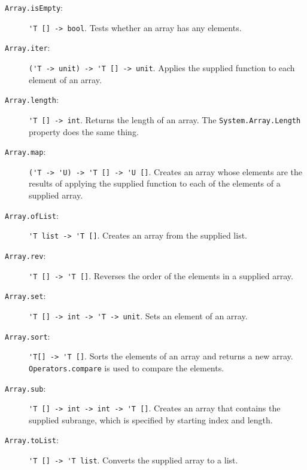 \begin{description}
\item[\texttt{Array.isEmpty}:] \lstinline{'T [] -> bool}. Tests whether an array has any elements.
\item[\texttt{Array.iter}:] \lstinline{('T -> unit) -> 'T [] -> unit}. Applies the supplied function to each element of an array.
\item[\texttt{Array.length}:] \lstinline{'T [] -> int}. Returns the length of an array. The \lstinline{System.Array.Length} property does the same thing.
\item[\texttt{Array.map}:] \lstinline{('T -> 'U) -> 'T [] -> 'U []}. Creates an array whose elements are the results of applying the supplied function to each of the elements of a supplied array.
\item[\texttt{Array.ofList}:] \lstinline{'T list -> 'T []}. Creates an array from the supplied list.
\item[\texttt{Array.rev}:] \lstinline{'T [] -> 'T []}. Reverses the order of the elements in a supplied array.
\item[\texttt{Array.set}:] \lstinline{'T [] -> int -> 'T -> unit}. Sets an element of an array.
\item[\texttt{Array.sort}:] \lstinline{'T[] -> 'T []}. Sorts the elements of an array and returns a new array. \lstinline{Operators.compare} is used to compare the elements.
\item[\texttt{Array.sub}:] \lstinline{'T [] -> int -> int -> 'T []}. Creates an array that contains the supplied subrange, which is specified by starting index and length.
\item[\texttt{Array.toList}:] \lstinline{'T [] -> 'T list}. Converts the supplied array to a list.

\end{description}
